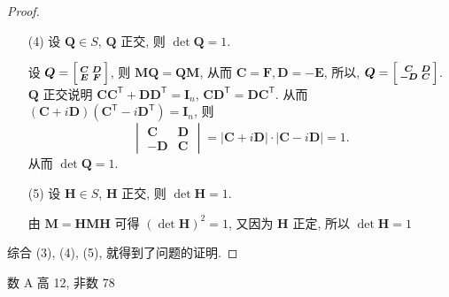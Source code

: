 \documentclass[a4paper, 12pt, UTF8]{ctexart}
\begin{document}
{\begin{proof}
\begin{itemize}
          $\boldsymbol{A} \in S, \boldsymbol{A}^{\mathsf T} \in S \Rightarrow \boldsymbol{AA}^{\mathsf T} \in S \Rightarrow \sqrt{\boldsymbol{AA}^{\mathsf T}} = \boldsymbol{H} \in S \Rightarrow \boldsymbol{Q} = \boldsymbol{AH}^{-1} \in S$.
          \item[(4)] 设 $\boldsymbol{Q} \in S$, $\boldsymbol{Q}$ 正交, 则 $\det \boldsymbol{Q} = 1$.

          设 $\boldsymbol{Q} =\Bigl[
          \begin{smallmatrix}
              \boldsymbol{C} & \boldsymbol{D}\\
              \boldsymbol{E} & \boldsymbol{F}
          \end{smallmatrix}\Bigr]
          $, 则 $\boldsymbol{MQ} = \boldsymbol{QM}$, 从而 $\boldsymbol{C}=\boldsymbol{F}, \boldsymbol{D} = \boldsymbol{-E}$, 所以, $\boldsymbol{Q} =\Bigl[
          \begin{smallmatrix}
              \boldsymbol{C} & \boldsymbol{D}\\
              \boldsymbol{-D} & \boldsymbol{C}
          \end{smallmatrix}\Bigr]
          $. $\boldsymbol{Q}$ 正交说明 $\boldsymbol{C}\boldsymbol{C}^{\mathsf T} + \boldsymbol{D}\boldsymbol{D}^{\mathsf T} = \boldsymbol{I}_{n}$, $\boldsymbol{CD}^{\mathsf T} = \boldsymbol{DC}^{\mathsf T}$. 从而 $(\boldsymbol{C} + i\boldsymbol{D})(\boldsymbol{C}^{\mathsf T} - i\boldsymbol{D}^{\mathsf T}) = \boldsymbol{I}_{n}$,  则
          \[
              \begin{vmatrix}
                  \boldsymbol{C} &  \boldsymbol{D}\\ - \boldsymbol{D} & \boldsymbol{C}
              \end{vmatrix} = \lvert \boldsymbol{C} + i\boldsymbol{D} \rvert \cdot \lvert \boldsymbol{C} - i\boldsymbol{D} \rvert = 1.
          \]
          从而 $\det \boldsymbol{Q} = 1$.
          \item[(5)] 设 $\boldsymbol{H} \in S$, $\boldsymbol{H}$ 正交, 则 $\det \boldsymbol{H} = 1$.

          由 $\boldsymbol{M} = \boldsymbol{HMH}$ 可得 $(\det \boldsymbol{H})^{2}=1$, 又因为 $\boldsymbol{H}$ 正定, 所以 $\det \boldsymbol{H} = 1$
      \end{itemize}
      综合 (3), (4), (5), 就得到了问题的证明.
  \end{proof}
}

{\color{GoogleGreen} 数 A 高 12, 非数 78

}
\end{document}
